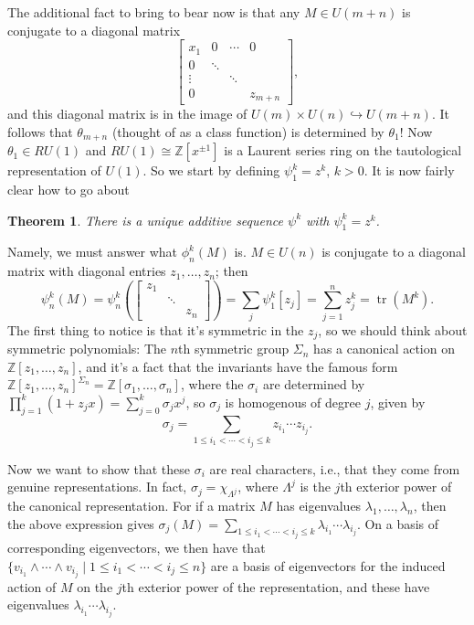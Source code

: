 \documentclass{article}
\newcommand{\Z}{\mathbb{Z}}
\newcommand{\into}{\hookrightarrow}
\DeclareMathOperator{\tr}{tr}
\newtheorem{thm}{Theorem}[section]
\begin{document}
The additional fact to bring to bear now is that any $M \in U(m+n)$ is conjugate to a diagonal matrix \[\left[\begin{array}{cccc}x_1 & 0 & \cdots & 0 \\ 0 & \ddots \\ \vdots & & \ddots \\ 0 & & & z_{m+n}\end{array}\right],\] and this diagonal matrix is in the image of $U(m) \times U(n) \into U(m+n)$.  It follows that $\theta_{m+n}$ (thought of as a class function) is determined by $\theta_1$!  Now $\theta_1 \in RU(1)$ and $RU(1) \cong \Z[x^{\pm 1}]$ is a Laurent series ring on the tautological representation of $U(1)$.  So we start by defining $\psi_1^k = z^k$, $k > 0$.  It is now fairly clear how to go about
\begin{thm}
There is a unique additive sequence $\psi^k$ with $\psi^k_1 = z^k$.
\end{thm}
Namely, we must answer what $\phi_n^k(M)$ is.  $M \in U(n)$ is conjugate to a diagonal matrix with diagonal entries $z_1, \ldots, z_n$; then \[\psi^k_n(M) = \psi^k_n \left( \left[ \begin{array}{ccc}z_1 \\ & \ddots \\ & & z_n\end{array} \right]\right) = \sum_j \psi^k_1 [z_j] = \sum_{j=1}^n z_j^k = \tr(M^k).\]  The first thing to notice is that it's symmetric in the $z_j$, so we should think about symmetric polynomials: The $n$th symmetric group $\Sigma_n$ has a canonical action on $\Z[z_1, \ldots, z_n]$, and it's a fact that the invariants have the famous form $\Z[z_1, \ldots, z_n]^{\Sigma_n} = \Z[\sigma_1, \ldots, \sigma_n]$, where the $\sigma_i$ are determined by $\prod_{j=1}^k (1+z_j x) = \sum_{j=0}^k \sigma_j x^j$, so $\sigma_j$ is homogenous of degree $j$, given by \[\sigma_j = \sum_{1 \le i_1 < \cdots < i_j \le k} z_{i_1} \cdots z_{i_j}.\]

Now we want to show that these $\sigma_i$ are real characters, i.e., that they come from genuine representations.  In fact, $\sigma_j = \chi_{\Lambda^j}$, where $\Lambda^j$ is the $j$th exterior power of the canonical representation.  For if a matrix $M$ has eigenvalues $\lambda_1, \ldots, \lambda_n$, then the above expression gives $\sigma_j(M) = \sum_{1 \le i_1 < \cdots < i_j \le k} \lambda_{i_1} \cdots \lambda_{i_j}$.  On a basis of corresponding eigenvectors, we then have that $\{v_{i_1} \wedge \cdots \wedge v_{i_j} \mid 1 \le i_1 < \cdots < i_j \le n\}$ are a basis of eigenvectors for the induced action of $M$ on the $j$th exterior power of the representation, and these have eigenvalues $\lambda_{i_1} \cdots \lambda_{i_j}$.
\end{document}
